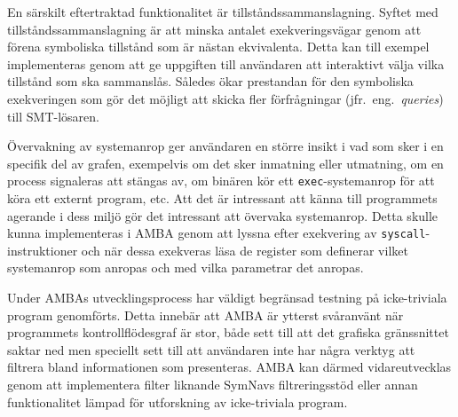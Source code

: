 En särskilt eftertraktad funktionalitet är tillståndssammanslagning. Syftet med
tillståndssammanslagning är att minska antalet exekveringsvägar genom att förena
symboliska tillstånd som är nästan ekvivalenta. Detta kan till exempel
implementeras genom att ge uppgiften till användaren att interaktivt välja vilka
tillstånd som ska sammanslås. Således ökar prestandan för den symboliska
exekveringen som gör det möjligt att skicka fler förfrågningar (jfr.\ eng.\
\emph{queries}) till SMT-lösaren.

Övervakning av systemanrop ger användaren en
större insikt i vad som sker i en specifik del av grafen, exempelvis om det sker
inmatning eller utmatning, om en process signaleras att stängas av, om binären
kör ett \texttt{exec}-systemanrop för att köra ett externt program, etc. Att det är
intressant att känna till programmets agerande i dess miljö gör det intressant
att övervaka systemanrop. Detta skulle kunna implementeras i AMBA genom att
lyssna efter exekvering av \texttt{syscall}-instruktioner och när dessa
exekveras läsa de register som definerar vilket systemanrop som anropas och med
vilka parametrar det anropas.

Under AMBAs utvecklingsprocess har väldigt begränsad testning på icke-triviala
program genomförts. Detta innebär att AMBA är ytterst svåranvänt när programmets
kontrollflödesgraf är stor, både sett till att det grafiska gränssnittet saktar
ned men speciellt sett till att användaren inte har några verktyg att filtrera
bland informationen som presenteras. AMBA kan därmed vidareutvecklas genom att
implementera filter liknande SymNavs filtreringsstöd eller annan funktionalitet
lämpad för utforskning av icke-triviala program.
